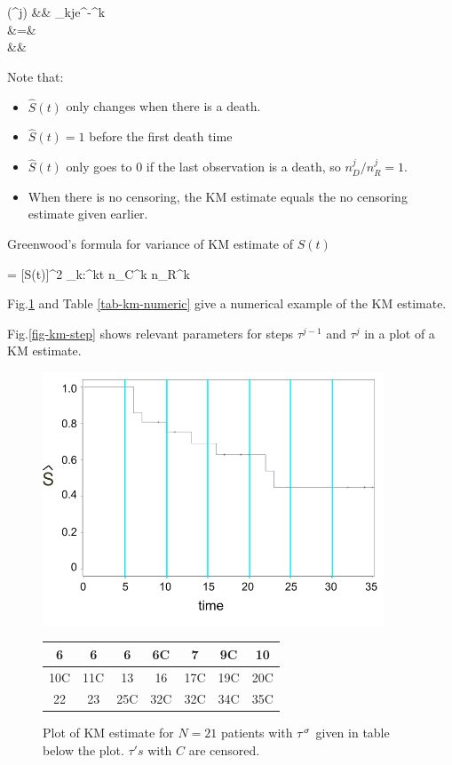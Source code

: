 \beqa
{}(\tau^j) &\approx&
\prod_{k\leq j}e^{-\hat{\lam}^k}
\\
&=&
\\
&\approx&
\eeqa

Note that:
\begin{itemize}
\item $\hat{S}(t)$ only changes when there is a death.
\item $\hat{S}(t)=1$ before the first death time
\item $\hat{S}(t)$ only goes to 0 if the last observation is a death,
so $n_D^j/n_R^j=1$.
\item When there is no censoring, the KM estimate equals
the no censoring estimate given earlier.
\end{itemize}

Greenwood's formula
for variance of KM estimate of $S(t)$

\beq
{}=
[S(t)]^2
\sum_{k:\tau^k\leq t}
{ n_C^k n_R^k}
\eeq

Fig.\ref{fig-kn-graph}
and Table \ref{tab-km-numeric} give a numerical
example of the
 KM estimate.

Fig.\ref{fig-km-step}
shows relevant parameters
for steps $\tau^{j-1}$ and $\tau^j$
in a plot of a KM estimate.





\newpage
 \begin{figure}[h!]
\centering
\includegraphics[width=4in]
{survival/km-graph.png}
\begin{tabular}{|c|c|c|c|c|c|c|}
\hline\hline
6& 6& 6& 6C& 7& 9C& 10\\
\hline
10C&11C& 13& 16& 17C& 19C& 20C\\
\hline
 22& 23& 25C& 32C& 32C& 34C& 35C\\
 \hline
 \end{tabular}
\caption{Plot of KM estimate for
$N=21$ patients
with $\tau^\sigma$ given in table
below the plot.
$\tau's$ with $C$
 are censored.}
\label{fig-kn-graph}
\end{figure}

